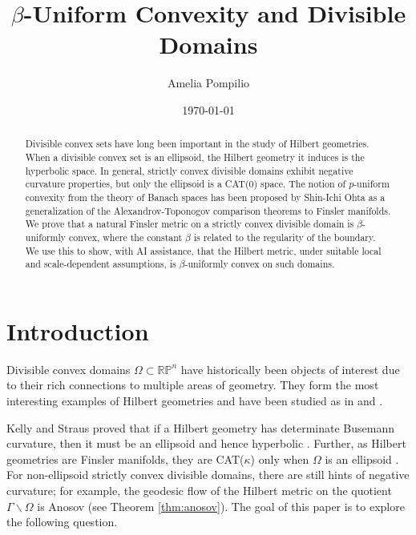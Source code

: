 \documentclass[letterpaper, 11pt, reqno]{amsart}
\newcommand\R{{\mathbb R}}
\renewcommand\P{{\mathbb P}}
\theoremstyle{definition}
\begin{document}
\title[Title goes here]{$\beta$-Uniform Convexity and Divisible Domains}
\author[A. Pompilio]{Amelia Pompilio}



\date{\today}

\begin{abstract}

Divisible convex sets have long been important in the study of Hilbert geometries. When a divisible convex set is an ellipsoid, the Hilbert geometry it induces is the hyperbolic space. In general, strictly convex divisible domains exhibit negative curvature properties, but only the ellipsoid is a CAT(0) space. The notion of $p$-uniform convexity from the theory of Banach spaces has been proposed by Shin-Ichi Ohta as a generalization of the Alexandrov-Toponogov comparison theorems to Finsler manifolds. We prove that a natural Finsler metric on a strictly convex divisible domain is $\beta$-uniformly convex, where the constant $\beta$ is related to the regularity of the boundary. We use this to show, with AI assistance, that the Hilbert metric, under suitable local and scale-dependent assumptions, is $\beta$-uniformly convex on such domains.

\end{abstract}

\maketitle 


\setcounter{tocdepth}{1}
\tableofcontents

\section{Introduction}
\label{sec:intro}

Divisible convex domains $\Omega \subset \R\P^n$ have historically been objects of interest due to their rich connections to multiple areas of geometry. They form the most interesting examples of Hilbert geometries and have been studied as in \cite{Benoist} and \cite{Marquis}. 

Kelly and Straus proved that if a Hilbert geometry has determinate Busemann curvature, then it must be an ellipsoid and hence hyperbolic \cite{KS1}. Further, as Hilbert geometries are Finsler manifolds, they are CAT($\kappa$) only when $\Omega$ is an ellipsoid \cite{Ohta}. For non-ellipsoid strictly convex divisible domains, there are still hints of negative curvature; for example, the geodesic flow of the Hilbert metric on the quotient $\Gamma \backslash \Omega$ is Anosov (see Theorem \ref{thm:anosov}). The goal of this paper is to explore the following question.
\end{document}
